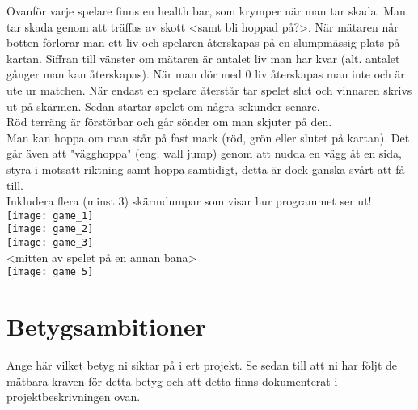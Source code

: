 \vspace{11pt}
Ovanför varje spelare finns en health bar, som krymper när man tar skada. Man tar skada genom att träffas av skott <samt bli hoppad på?>. När mätaren når botten förlorar man ett liv och spelaren återskapas på en slumpmässig plats på kartan. Siffran till vänster om mätaren är antalet liv man har kvar (alt. antalet gånger man kan återskapas). När man dör med 0 liv återskapas man inte och är ute ur matchen. När endast en spelare återstår tar spelet slut och vinnaren skrivs ut på skärmen. Sedan startar spelet om några sekunder senare.\\
\vspace{11pt}
Röd terräng är förstörbar och går sönder om man skjuter på den.\\
\vspace{11pt}
Man kan hoppa om man står på fast mark (röd, grön eller slutet på kartan). Det går även att "vägghoppa" (eng. wall jump) genom att nudda en vägg åt en sida, styra i motsatt riktning samt hoppa samtidigt, detta är dock ganska svårt att få till.\\
\vspace{11pt}
Inkludera flera (minst 3) skärmdumpar som visar hur programmet ser ut!\\
\texttt{[image: game\_1]}\\
\vspace{11pt}
\texttt{[image: game\_2]}\\
\vspace{11pt}
\texttt{[image: game\_3]}\\
\vspace{11pt}
<mitten av spelet på en annan bana>\\
\vspace{11pt}
\texttt{[image: game\_5]}\\
\section{Betygsambitioner}
{\color{red}Ange här vilket betyg ni siktar på i ert projekt.  Se sedan till att ni har följt de mätbara kraven för detta betyg och att detta finns dokumenterat i projektbeskrivningen ovan.\\}
